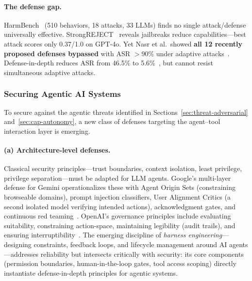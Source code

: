 \paragraph{The defense gap.}
HarmBench~\cite{mazeika2024harmbench} (510 behaviors, 18 attacks, 33 LLMs) finds no single attack/defense universally effective. StrongREJECT~\cite{souly2024strongreject} reveals jailbreaks reduce capabilities---best attack scores only 0.37/1.0 on GPT-4o. Yet Nasr et al.\ showed \textbf{all 12 recently proposed defenses bypassed} with ASR $>$90\% under adaptive attacks~\cite{nasr2025attacker}. Defense-in-depth reduces ASR from 46.5\% to 5.6\%~\cite{dong2024hierarchical}, but cannot resist simultaneous adaptive attacks.


\subsubsection{Securing Agentic AI Systems}
\label{sec:agentic-security}


To secure against the agentic threats identified in Sections~\ref{sec:threat-adversarial} and~\ref{sec:cap-autonomy}, a new class of defenses targeting the agent--tool interaction layer is emerging.

\paragraph{(a) Architecture-level defenses.}
Classical security principles---trust boundaries, context isolation, least privilege, privilege separation---must be adapted for LLM agents. Google's multi-layer defense for Gemini operationalizes these with Agent Origin Sets (constraining browseable domains), prompt injection classifiers, User Alignment Critics (a second isolated model verifying intended actions), acknowledgment gates, and continuous red teaming~\cite{google2025geminidefense}. OpenAI's governance principles include evaluating suitability, constraining action-space, maintaining legibility (audit trails), and ensuring interruptibility~\cite{shavit2024agenticgovernance}. The emerging discipline of \emph{harness engineering}---designing constraints, feedback loops, and lifecycle management around AI agents---addresses reliability but intersects critically with security: its core components (permission boundaries, human-in-the-loop gates, tool access scoping) directly instantiate defense-in-depth principles for agentic systems.

